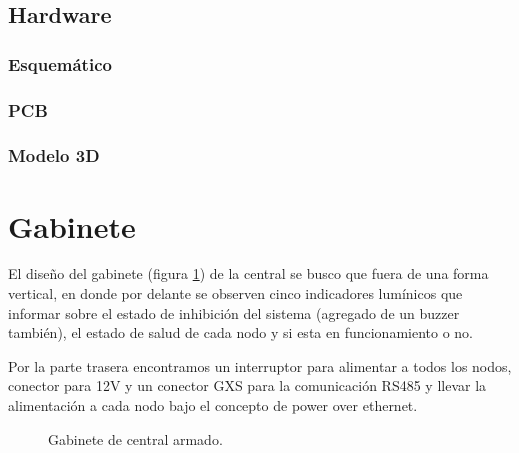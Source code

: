 \subsection{Hardware}
\subsubsection{Esquemático}
\subsubsection{PCB}
\subsubsection{Modelo 3D}
\section{Gabinete}
\par El diseño del gabinete (figura \ref{im:gabinete-central}) de la central se busco que fuera de una forma vertical, en donde por delante se observen cinco indicadores lumínicos que informar sobre el estado de inhibición del sistema (agregado de un buzzer también), el estado de salud de cada nodo y si esta en funcionamiento o no.
\par Por la parte trasera encontramos un interruptor para alimentar a todos los nodos, conector para 12V y un conector GXS para la comunicación RS485 y llevar la alimentación a cada nodo bajo el concepto de power over ethernet. 
\begin{figure}[h!]
\begin{center}
    \caption{Gabinete de central armado.}
	\label{im:gabinete-central}
\end{center}
\end{figure}

